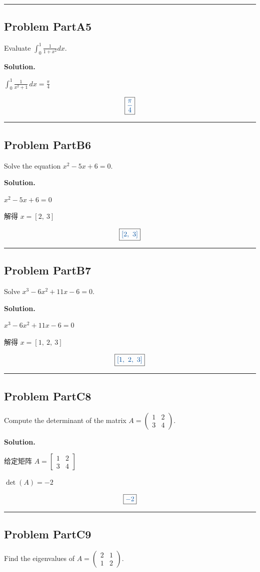 \documentclass[11pt, a4paper]{ctexart}
\newcommand{\problem}[1]{\subsection*{Problem #1}}
\newcommand{\solution}{\par\noindent\textbf{Solution.}\par\smallskip}
\begin{document}
\vspace{0.6em}\hrule\vspace{0.6em}
\problem{PartA5}

Evaluate $\int_0^1 \frac{1}{1+x^2} dx$.

\solution
$\int_{0}^{1} \frac{1}{x^{2} + 1}\,dx = \frac{\pi}{4}$

\[\boxed{\textcolor{anscolor}{\frac{\pi}{4}}}\]

\vspace{0.6em}\hrule\vspace{0.6em}
\problem{PartB6}

Solve the equation $x^2 - 5x + 6 = 0$.

\solution
$x^{2} - 5 x + 6 = 0$

解得 $x = \left[ 2, \  3\right]$

\[\boxed{\textcolor{anscolor}{\left[ 2, \  3\right]}}\]

\vspace{0.6em}\hrule\vspace{0.6em}
\problem{PartB7}

Solve $x^3 - 6x^2 + 11x - 6 = 0$.

\solution
$x^{3} - 6 x^{2} + 11 x - 6 = 0$

解得 $x = \left[ 1, \  2, \  3\right]$

\[\boxed{\textcolor{anscolor}{\left[ 1, \  2, \  3\right]}}\]

\vspace{0.6em}\hrule\vspace{0.6em}
\problem{PartC8}

Compute the determinant of the matrix $A = \begin{pmatrix} 1 & 2 \\ 3 & 4 \end{pmatrix}$.

\solution
给定矩阵 $A = \left[\begin{matrix}1 & 2\\3 & 4\end{matrix}\right]$

$\det(A) = -2$

\[\boxed{\textcolor{anscolor}{-2}}\]

\vspace{0.6em}\hrule\vspace{0.6em}
\problem{PartC9}

Find the eigenvalues of $A = \begin{pmatrix} 2 & 1 \\ 1 & 2 \end{pmatrix}$.
\end{document}
